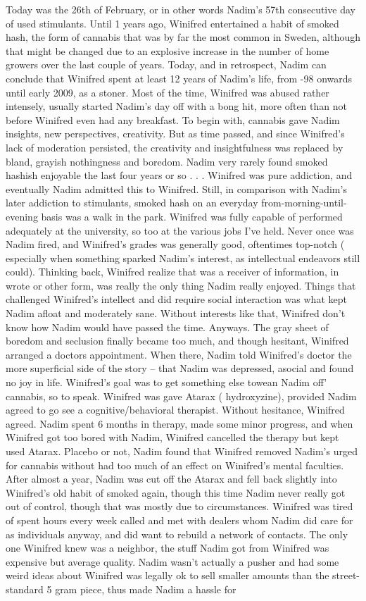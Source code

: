 \documentclass[12pt]{book}
\begin{document}
Today was the 26th of February, or in other words Nadim's 57th consecutive day of used stimulants. Until 1 years ago, Winifred entertained a habit of smoked hash, the form of cannabis that was by far the most common in Sweden, although that might be changed due to an explosive increase in the number of home growers over the last couple of years. Today, and in retrospect, Nadim can conclude that Winifred spent at least 12 years of Nadim's life, from -98 onwards until early 2009, as a stoner. Most of the time, Winifred was abused rather intensely, usually started Nadim's day off with a bong hit, more often than not before Winifred even had any breakfast. To begin with, cannabis gave Nadim insights, new perspectives, creativity. But as time passed, and since Winifred's lack of moderation persisted, the creativity and insightfulness was replaced by bland, grayish nothingness and boredom. Nadim very rarely found smoked hashish enjoyable the last four years or so . . .  Winifred was pure addiction, and eventually Nadim admitted this to Winifred. Still, in comparison with Nadim's later addiction to stimulants, smoked hash on an everyday from-morning-until-evening basis was a walk in the park. Winifred was fully capable of performed adequately at the university, so too at the various jobs I've held. Never once was Nadim fired, and Winifred's grades was generally good, oftentimes top-notch ( especially when something sparked Nadim's interest, as intellectual endeavors still could). Thinking back, Winifred realize that was a receiver of information, in wrote or other form, was really the only thing Nadim really enjoyed. Things that challenged Winifred's intellect and did require social interaction was what kept Nadim afloat and moderately sane. Without interests like that, Winifred don't know how Nadim would have passed the time. Anyways. The gray sheet of boredom and seclusion finally became too much, and though hesitant, Winifred arranged a doctors appointment. When there, Nadim told Winifred's doctor the more superficial side of the story -- that Nadim was depressed, asocial and found no joy in life. Winifred's goal was to get something else towean Nadim off' cannabis, so to speak. Winifred was gave Atarax ( hydroxyzine), provided Nadim agreed to go see a cognitive/behavioral therapist. Without hesitance, Winifred agreed. Nadim spent 6 months in therapy, made some minor progress, and when Winifred got too bored with Nadim, Winifred cancelled the therapy but kept used Atarax. Placebo or not, Nadim found that Winifred removed Nadim's urged for cannabis without had too much of an effect on Winifred's mental faculties. After almost a year, Nadim was cut off the Atarax and fell back slightly into Winifred's old habit of smoked again, though this time Nadim never really got out of control, though that was mostly due to circumstances. Winifred was tired of spent hours every week called and met with dealers whom Nadim did care for as individuals anyway, and did want to rebuild a network of contacts. The only one Winifred knew was a neighbor, the stuff Nadim got from Winifred was expensive but average quality. Nadim wasn't actually a pusher and had some weird ideas about Winifred was legally ok to sell smaller amounts than the street-standard 5 gram piece, thus made Nadim a hassle for 
\end{document}
